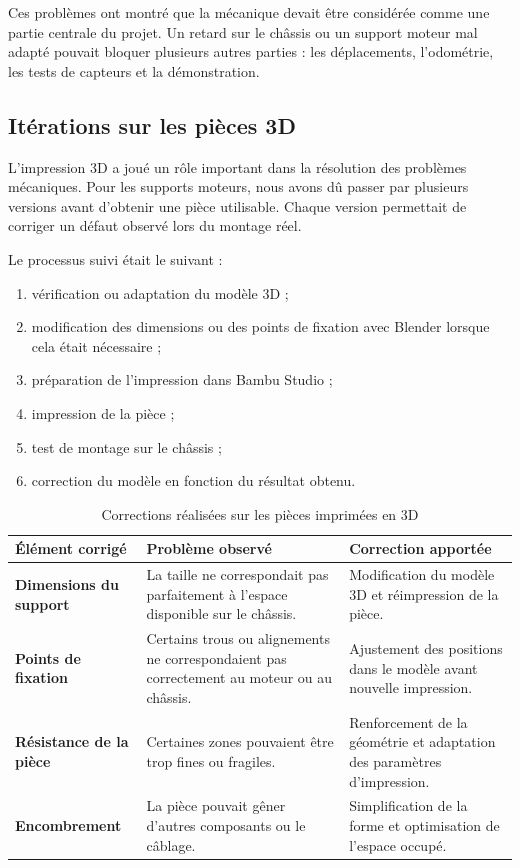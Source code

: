\documentclass[11pt,a4paper]{report}
\begin{document}
Ces problèmes ont montré que la mécanique devait être considérée comme une partie centrale du projet. Un retard sur le châssis ou un support moteur mal adapté pouvait bloquer plusieurs autres parties : les déplacements, l'odométrie, les tests de capteurs et la démonstration.

\subsection{Itérations sur les pièces 3D}

L'impression 3D a joué un rôle important dans la résolution des problèmes mécaniques. Pour les supports moteurs, nous avons dû passer par plusieurs versions avant d'obtenir une pièce utilisable. Chaque version permettait de corriger un défaut observé lors du montage réel.

Le processus suivi était le suivant :
\begin{enumerate}
    \item vérification ou adaptation du modèle 3D ;
    \item modification des dimensions ou des points de fixation avec Blender lorsque cela était nécessaire ;
    \item préparation de l'impression dans Bambu Studio ;
    \item impression de la pièce ;
    \item test de montage sur le châssis ;
    \item correction du modèle en fonction du résultat obtenu.
\end{enumerate}

\begin{table}[H]
\centering
\small
\renewcommand{\arraystretch}{1.25}
\begin{tabular}{|p{3.5cm}|p{5.5cm}|p{5.5cm}|}
\hline
\textbf{Élément corrigé} & \textbf{Problème observé} & \textbf{Correction apportée} \\
\hline
\textbf{Dimensions du support} &
La taille ne correspondait pas parfaitement à l'espace disponible sur le châssis. &
Modification du modèle 3D et réimpression de la pièce. \\
\hline
\textbf{Points de fixation} &
Certains trous ou alignements ne correspondaient pas correctement au moteur ou au châssis. &
Ajustement des positions dans le modèle avant nouvelle impression. \\
\hline
\textbf{Résistance de la pièce} &
Certaines zones pouvaient être trop fines ou fragiles. &
Renforcement de la géométrie et adaptation des paramètres d'impression. \\
\hline
\textbf{Encombrement} &
La pièce pouvait gêner d'autres composants ou le câblage. &
Simplification de la forme et optimisation de l'espace occupé. \\
\hline
\end{tabular}
\caption{Corrections réalisées sur les pièces imprimées en 3D}
\label{tab:iterations_3d}
\end{table}
\end{document}
